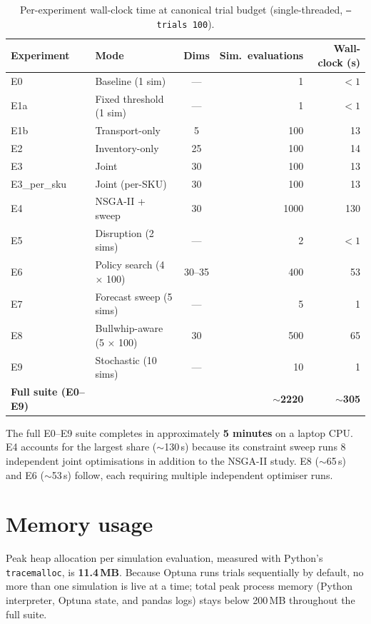 \begin{table}[H]
  \centering
  \caption{Per-experiment wall-clock time at canonical trial budget (single-threaded,
           \texttt{--trials~100}).}
  \label{tab:rt-per-exp}
  \begin{tabular}{@{}llcrr@{}}
    \toprule
    Experiment & Mode & Dims & Sim.\ evaluations & Wall-clock (s) \\
    \midrule
    E0  & Baseline (1 sim)                  & ---    &    1 &  $<1$ \\
    E1a & Fixed threshold (1 sim)            & ---    &    1 &  $<1$ \\
    E1b & Transport-only                     & 5      &  100 &   13  \\
    E2  & Inventory-only                     & 25     &  100 &   14  \\
    E3  & Joint                              & 30     &  100 &   13  \\
    E3\_per\_sku & Joint (per-SKU)           & 30     &  100 &   13  \\
    E4  & NSGA-II + sweep                    & 30     & 1000 &  130  \\
    E5  & Disruption (2 sims)                & ---    &    2 &  $<1$ \\
    E6  & Policy search (4 $\times$ 100)     & 30--35 &  400 &   53  \\
    E7  & Forecast sweep (5 sims)            & ---    &    5 &    1  \\
    E8  & Bullwhip-aware (5 $\times$ 100)    & 30     &  500 &   65  \\
    E9  & Stochastic (10 sims)               & ---    &   10 &    1  \\
    \midrule
    \textbf{Full suite (E0--E9)} & & & \textbf{$\sim$2220} & \textbf{$\sim$305} \\
    \bottomrule
  \end{tabular}
\end{table}

The full E0--E9 suite completes in approximately \textbf{5 minutes}
on a laptop CPU.  E4 accounts for the largest share ($\sim$130\,s)
because its constraint sweep runs 8 independent joint optimisations in
addition to the NSGA-II study.  E8 ($\sim$65\,s) and E6 ($\sim$53\,s)
follow, each requiring multiple independent optimiser runs.

\section*{Memory usage}

Peak heap allocation per simulation evaluation, measured with Python's
\texttt{tracemalloc}, is \textbf{11.4\,MB}.  Because Optuna runs
trials sequentially by default, no more than one simulation is live at
a time; total peak process memory (Python interpreter, Optuna state,
and pandas logs) stays below 200\,MB throughout the full suite.
